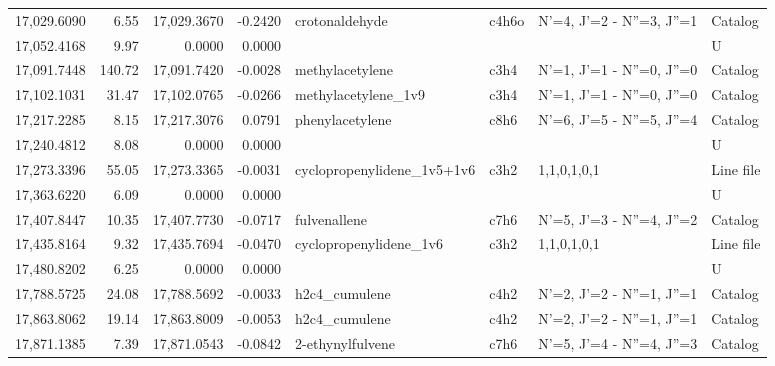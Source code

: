 \begin{longtable}{rrrrllll}
17,029.6090 &      6.55 &       17,029.3670 &   -0.2420 &              crotonaldehyde &   c4h6o &            N'=4, J'=2 - N''=3, J''=1 &    Catalog \\
17,052.4168 &      9.97 &            0.0000 &    0.0000 &                             &         &                                      &          U \\
17,091.7448 &    140.72 &       17,091.7420 &   -0.0028 &             methylacetylene &    c3h4 &            N'=1, J'=1 - N''=0, J''=0 &    Catalog \\
17,102.1031 &     31.47 &       17,102.0765 &   -0.0266 &         methylacetylene_1v9 &    c3h4 &            N'=1, J'=1 - N''=0, J''=0 &    Catalog \\
17,217.2285 &      8.15 &       17,217.3076 &    0.0791 &             phenylacetylene &    c8h6 &            N'=6, J'=5 - N''=5, J''=4 &    Catalog \\
17,240.4812 &      8.08 &            0.0000 &    0.0000 &                             &         &                                      &          U \\
17,273.3396 &     55.05 &       17,273.3365 &   -0.0031 &  cyclopropenylidene_1v5+1v6 &    c3h2 &                          1,1,0,1,0,1 &  Line file \\
17,363.6220 &      6.09 &            0.0000 &    0.0000 &                             &         &                                      &          U \\
17,407.8447 &     10.35 &       17,407.7730 &   -0.0717 &                fulvenallene &    c7h6 &            N'=5, J'=3 - N''=4, J''=2 &    Catalog \\
17,435.8164 &      9.32 &       17,435.7694 &   -0.0470 &      cyclopropenylidene_1v6 &    c3h2 &                          1,1,0,1,0,1 &  Line file \\
17,480.8202 &      6.25 &            0.0000 &    0.0000 &                             &         &                                      &          U \\
17,788.5725 &     24.08 &       17,788.5692 &   -0.0033 &               h2c4_cumulene &    c4h2 &            N'=2, J'=2 - N''=1, J''=1 &    Catalog \\
17,863.8062 &     19.14 &       17,863.8009 &   -0.0053 &               h2c4_cumulene &    c4h2 &            N'=2, J'=2 - N''=1, J''=1 &    Catalog \\
17,871.1385 &      7.39 &       17,871.0543 &   -0.0842 &            2-ethynylfulvene &    c7h6 &            N'=5, J'=4 - N''=4, J''=3 &    Catalog \\

\end{longtable}
